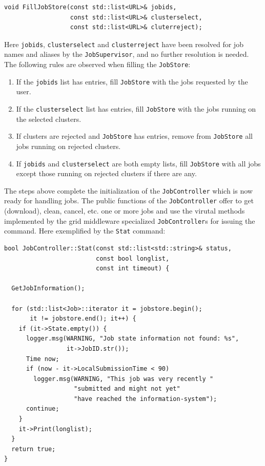 \documentclass{book}
\newcommand{\JobController}{\texttt{JobController}}
\newcommand{\JobSupervisor}{\texttt{JobSupervisor}}
\begin{document}
\begin{shaded}
\begin{verbatim}
void FillJobStore(const std::list<URL>& jobids,
                  const std::list<URL>& clusterselect,
                  const std::list<URL>& cluterreject);
\end{verbatim}
\end{shaded}

Here \texttt{jobids}, \texttt{clusterselect} and
\texttt{clusterreject} have been resolved for job names and aliases by
the {\JobSupervisor}, and no further resolution is needed. The
following rules are observed when filling the \texttt{JobStore}:

\begin{enumerate}
\item{If the \texttt{jobids} list has entries, fill \texttt{JobStore}
  with the jobs requested by the user.}
\item{If the \texttt{clusterselect} list has entries, fill
  \texttt{JobStore} with the jobs running on the selected clusters.}
\item{If clusters are rejected and \texttt{JobStore} has entries,
  remove from \texttt{JobStore} all jobs running on rejected
  clusters.}
\item{If \texttt{jobids} and \texttt{clusterselect} are both empty
  lists, fill \texttt{JobStore} with all jobs except those running on
  rejected clusters if there are any.}
\end{enumerate}

The steps above complete the initialization of the {\JobController}
which is now ready for handling jobs. The public functions of the
{\JobController} offer to get (download), clean, cancel, etc. one or
more jobs and use the virutal methods implemented by the grid middleware 
specialized {\JobController}s for issuing the command. Here exemplified 
by the \texttt{Stat} command:

\begin{shaded}
\begin{small}
\begin{verbatim}
bool JobController::Stat(const std::list<std::string>& status,
                         const bool longlist,
                         const int timeout) {

  GetJobInformation();

  for (std::list<Job>::iterator it = jobstore.begin();
       it != jobstore.end(); it++) {
    if (it->State.empty()) {
      logger.msg(WARNING, "Job state information not found: %s",
                 it->JobID.str());
      Time now;
      if (now - it->LocalSubmissionTime < 90)
        logger.msg(WARNING, "This job was very recently "
                   "submitted and might not yet"
                   "have reached the information-system");
      continue;
    }
    it->Print(longlist);
  }
  return true;
}
\end{verbatim}
\end{small}
\end{shaded}
\end{document}
